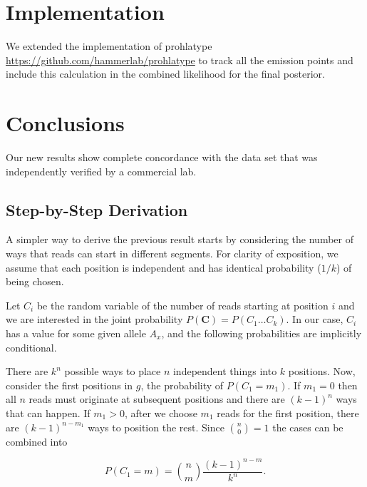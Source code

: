\section{Implementation}

We extended the implementation of prohlatype 
\url{https://github.com/hammerlab/prohlatype}
to track all the emission points and
include this calculation in the combined likelihood
for the final posterior.

\section{Conclusions}

Our new results show complete concordance with the data set that was
independently verified by a commercial lab.

\clearpage




\clearpage

\appendix

\subsection{Step-by-Step Derivation}

A simpler way to derive the previous result starts by considering the number
of ways that reads can start in different segments.
For clarity of exposition,
we assume that each position is independent
and has identical probability ($1/k$) of being chosen.

Let $C_{i}$ be the random variable of the number of reads starting at position
$i$ 
and we are interested in the joint probability $P(\mathbf{C})=P(C_{1} \ldots C_{k})$.
In our case, $C_{i}$ has a value for some given allele $A_{x}$,
and the following probabilities are implicitly conditional.

There are $k^{n}$ possible ways to place $n$ independent things into $k$ positions.
Now, consider the first positions in $g$, the probability of $P(C_{1} = m_{1})$.
If $m_{1}=0$ then all $n$ reads must originate at subsequent positions and there
are $(k-1)^{n}$ ways that can happen.
If $m_{1} > 0$, after we choose $m_{1}$ reads for the first position,
there are $(k-1)^{n-m_{1}}$ ways to position the rest.
Since ${n \choose 0} = 1$ the cases can be combined into

\begin{equation}
  P(C_{1} = m) ={n \choose m}\frac{(k-1)^{n-m}}{k^{n}}. \nonumber
\end{equation}

